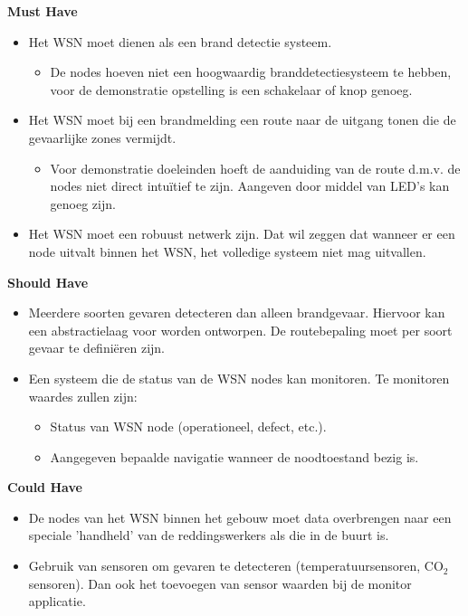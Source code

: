 \documentclass{../local}
\begin{document}
\noindent\textbf{Must Have}
\begin{itemize}
\item Het WSN moet dienen als een brand detectie systeem.
\begin{itemize}
\item De nodes hoeven niet een hoogwaardig branddetectiesysteem te hebben, voor de demonstratie opstelling is een schakelaar of knop genoeg.
\end{itemize}
\item Het WSN moet bij een brandmelding een route naar de uitgang tonen die de gevaarlijke zones vermijdt.
\begin{itemize}
\item Voor demonstratie doeleinden hoeft de aanduiding van de route d.m.v. de nodes niet direct intuïtief te zijn. Aangeven door middel van LED's kan genoeg zijn.
\end{itemize}
\item Het WSN moet een robuust netwerk zijn. Dat wil zeggen dat wanneer er een node uitvalt binnen het WSN, het volledige systeem niet mag uitvallen.
\end{itemize}

\noindent\textbf{Should Have}
\begin{itemize}
\item Meerdere soorten gevaren detecteren dan alleen brandgevaar. Hiervoor kan een abstractielaag voor worden ontworpen. De routebepaling moet per soort gevaar te definiëren zijn.
\item Een systeem die de status van de WSN nodes kan monitoren. Te monitoren waardes zullen zijn:
\begin{itemize}
\item Status van WSN node (operationeel, defect, etc.).
\item Aangegeven bepaalde navigatie wanneer de noodtoestand bezig is.
\end{itemize}
\end{itemize}

\noindent\textbf{Could Have}
\begin{itemize}
\item De nodes van het WSN binnen het gebouw moet data overbrengen naar een speciale 'handheld' van de reddingswerkers als die in de buurt is.
\item Gebruik van sensoren om gevaren te detecteren (temperatuursensoren, CO$_{2}$ sensoren). Dan ook het toevoegen van sensor waarden bij de monitor applicatie.
\end{itemize}
\end{document}

